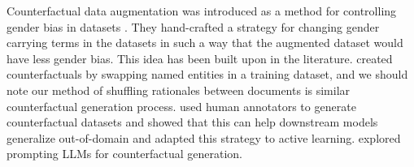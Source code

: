 Counterfactual data augmentation was introduced as a method for controlling gender bias in datasets \cite{lu_gender_2020}. They hand-crafted a strategy for changing gender carrying terms in the datasets in such a way that the augmented dataset would have less gender bias. This idea has been built upon in the literature. \citeauthor{zeng_counterfactual_2020} created counterfactuals by swapping named entities in a training dataset, and we should note our method of shuffling rationales between documents is similar counterfactual generation process. \citeauthor{kaushik_learning_2020} used human annotators to generate counterfactual datasets and showed that this can help downstream models generalize out-of-domain and \citeauthor{deng_counterfactual_2023} adapted this strategy to active learning. \citeauthor{li_prompting_2024} explored prompting LLMs for counterfactual generation.